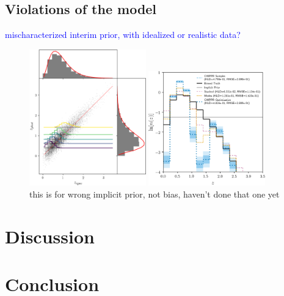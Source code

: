 \documentclass[iop]{emulateapj}
\begin{document}
\subsection{Violations of the model}
\label{sec:violations}

\textcolor{blue}{mischaracterized interim prior, with idealized or realistic 
data?}

\begin{figure}
	\begin{center}
		\includegraphics[width=0.45\textwidth]{fig/wrong_scatter.png}
		
\includegraphics[width=0.45\textwidth]{fig/wrong_log_estimators.png}
		\caption{this is for wrong implicit prior, not bias, haven't 
done that one yet}
		\label{fig:mischaracterized}
	\end{center}
\end{figure}


\section{Discussion}
\label{sec:discussion}



\section{Conclusion}
\label{sec:conclusion}
\end{document}
